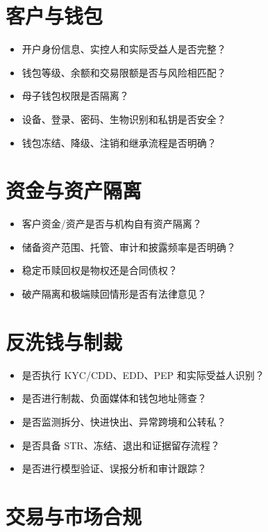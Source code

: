 \section{客户与钱包}\label{ux5ba2ux6237ux4e0eux94b1ux5305}

\begin{itemize}
\tightlist
\item
  开户身份信息、实控人和实际受益人是否完整？
\item
  钱包等级、余额和交易限额是否与风险相匹配？
\item
  母子钱包权限是否隔离？
\item
  设备、登录、密码、生物识别和私钥是否安全？
\item
  钱包冻结、降级、注销和继承流程是否明确？
\end{itemize}

\section{资金与资产隔离}\label{ux8d44ux91d1ux4e0eux8d44ux4ea7ux9694ux79bb}

\begin{itemize}
\tightlist
\item
  客户资金/资产是否与机构自有资产隔离？
\item
  储备资产范围、托管、审计和披露频率是否明确？
\item
  稳定币赎回权是物权还是合同债权？
\item
  破产隔离和极端赎回情形是否有法律意见？
\end{itemize}

\section{反洗钱与制裁}\label{ux53cdux6d17ux94b1ux4e0eux5236ux88c1}

\begin{itemize}
\tightlist
\item
  是否执行 KYC/CDD、EDD、PEP 和实际受益人识别？
\item
  是否进行制裁、负面媒体和钱包地址筛查？
\item
  是否监测拆分、快进快出、异常跨境和公转私？
\item
  是否具备 STR、冻结、退出和证据留存流程？
\item
  是否进行模型验证、误报分析和审计跟踪？
\end{itemize}

\section{交易与市场合规}\label{ux4ea4ux6613ux4e0eux5e02ux573aux5408ux89c4}

